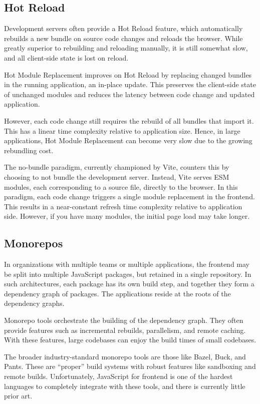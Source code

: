 \documentclass{article}
\begin{document}
\subsection{Hot Reload}

Development servers often provide a Hot Reload feature, which automatically rebuilds a new bundle on
source code changes and reloads the browser. While greatly superior to rebuilding and reloading
manually, it is still somewhat slow, and all client-side state is lost on reload.

Hot Module Replacement improves on Hot Reload by replacing changed bundles in the running
application, an in-place update. This preserves the client-side state of unchanged modules and
reduces the latency between code change and updated application.

However, each code change still requires the rebuild of all bundles that import it. This has a
linear time complexity relative to application size. Hence, in large applications, Hot Module
Replacement can become very slow due to the growing rebundling cost.

The no-bundle paradigm, currently championed by Vite, counters this by choosing to not bundle the
development server. Instead, Vite serves ESM modules, each corresponding to a source file, directly
to the browser. In this paradigm, each code change triggers a single module replacement in the
frontend. This results in a near-constant refresh time complexity relative to application side.
However, if you have many modules, the initial page load may take longer.

\subsection{Monorepos}

In organizations with multiple teams or multiple applications, the frontend may be split into
multiple JavaScript packages, but retained in a single repository. In such architectures, each
package has its own build step, and together they form a dependency graph of packages. The
applications reside at the roots of the dependency graphs.

Monorepo tools orchestrate the building of the dependency graph. They often provide features such as
incremental rebuilds, parallelism, and remote caching. With these features, large codebases can
enjoy the build times of small codebases.

The broader industry-standard monorepo tools are those like Bazel, Buck, and Pants. These are
``proper'' build systems with robust features like sandboxing and remote builds. Unfortunately,
JavaScript for frontend is one of the hardest languages to completely integrate with these tools,
and there is currently little prior art.
\end{document}
